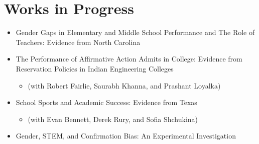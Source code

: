 \documentclass[letter,10pt]{article}
\begin{document}
\section{Works in Progress}
\begin{itemize}
    \item Gender Gaps in Elementary and Middle School Performance and The Role of Teachers: Evidence from North Carolina
    \item The Performance of Affirmative Action Admits in College: Evidence from Reservation Policies in Indian Engineering Colleges  
    \begin{itemize}
            \item[] \small{(with Robert Fairlie, Saurabh Khanna, and Prashant Loyalka)}
        \end{itemize}
        \item School Sports and Academic Success: Evidence from Texas 
    \begin{itemize}
           \item[] \small{(with Evan Bennett, Derek Rury, and Sofia Shchukina)}
        \end{itemize}
      \item Gender, STEM, and Confirmation Bias: An Experimental Investigation 
\end{itemize}
\end{document}
